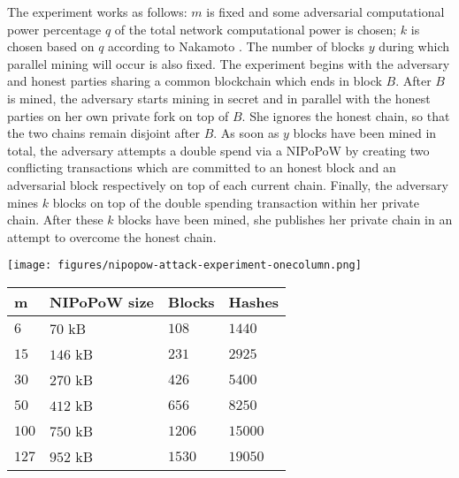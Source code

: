 The experiment works as follows: $m$ is fixed and some adversarial computational
power percentage $q$ of the total network computational power is chosen; $k$ is
chosen based on $q$ according to Nakamoto \cite{bitcoin}. The number of blocks
$y$ during which parallel mining will occur is also fixed. The experiment begins
with the adversary and honest parties sharing a common blockchain which ends in
block $B$. After $B$ is mined, the adversary starts mining in secret and in
parallel with the honest parties on her own private fork on top of $B$. She
ignores the honest chain, so that the two chains remain disjoint after $B$. As
soon as $y$ blocks have been mined in total, the adversary attempts a double
spend via a NIPoPoW
by creating two conflicting transactions which are committed to an honest
block and an adversarial block respectively on top of each current chain.
Finally, the adversary mines $k$ blocks on top of the double spending
transaction within her private chain. After these $k$ blocks have been mined,
she publishes her private chain in an attempt to overcome the honest chain.

\begin{minipage}{\textwidth}
    \begin{minipage}[t]{0.49\textwidth}
      \texttt{[image: figures/nipopow-attack-experiment-onecolumn.png]}
    \end{minipage}
    \hfill
    \begin{minipage}[b]{0.49\textwidth}
      \begin{tabular}{l|l|l|l}
          {\bf m}  & {\bf NIPoPoW size} & {\bf Blocks} & {\bf
          Hashes}\\
          \hline
          $6$   & $70$  kB & $108$ & $1440$  \\
          $15$  & $146$ kB & $231$ & $2925$  \\
          $30$  & $270$ kB & $426$ & $5400$  \\
          $50$  & $412$ kB & $656$ & $8250$ \\
          $100$ & $750$ kB & $1206$ & $15000$ \\
          $127$ & $952$ kB & $1530$ & $19050$ \\
      \end{tabular}
    \end{minipage}
\end{minipage}
\vskip2pt


